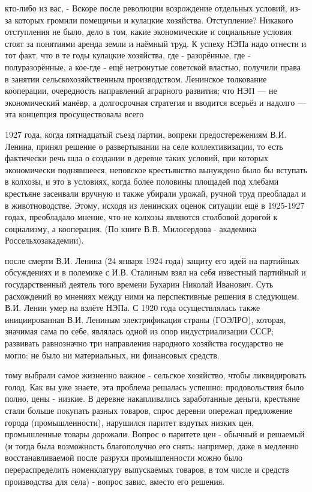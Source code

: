 кто-либо из вас, - Вскоре после революции возрождение отдельных условий, из-за которых громили помещичьи и кулацкие хозяйства. Отступление? Никакого отступления не было, дело в том, какие экономические и социальные условия стоят за понятиями аренда земли и наёмный труд. К успеху НЭПа надо отнести и тот факт, что в те годы кулацкие хозяйства, где - разорённые, где - полуразорённые, а кое-где - ещё нетронутые советской властью, получили права в занятии сельскохозяйственным производством. Ленинское толкование кооперации, очередность направлений аграрного развития; что НЭП — не экономический манёвр, а долгосрочная стратегия и вводится всерьёз и надолго — эта концепция просуществовала всего

1927 года, когда пятнадцатый съезд партии, вопреки предостережениям В.И. Ленина, принял решение о развертывании на селе коллективизации, то есть фактически речь шла о создании в деревне таких условий, при которых экономически поднявшееся, неповское крестьянство вынуждено было бы вступать в колхозы, и это в условиях, когда более половины площадей под хлебами крестьяне засеивали вручную и также убирали урожай, ручной труд преобладал и в животноводстве. Этому, исходя из ленинских оценок ситуации ещё в 1925-1927 годах, преобладало мнение, что не колхозы являются столбовой дорогой к социализму, а кооперация. (По книге В.В. Милосердова - академика Россельхозакадемии).

после смерти
В.И. Ленина (24 января 1924 года) защиту его идей на партийных обсуждениях и в полемике с И.В. Сталиным взял на себя известный партийный и государственный деятель того времени Бухарин Николай Иванович. Суть расхождений во мнениях между ними на перспективные решения в следующем. В.И. Ленин умер на взлёте НЭПа. С 1920 года осуществлялась также инициированная В.И. Лениным электрификация страны (ГОЭЛРО), которая, значимая сама по себе, являлась одной из опор индустриализации СССР; развивать равнозначно три направления народного хозяйства государство не могло: не было ни материальных, ни финансовых средств.

тому выбрали самое жизненно важное - сельское хозяйство, чтобы ликвидировать голод. Как вы уже знаете, эта проблема решалась успешно: продовольствия было полно, цены - низкие. В деревне накапливались заработанные деньги, крестьяне стали больше покупать разных товаров, спрос деревни опережал предложение города (промышленности), нарушился паритет вздутых низких цен, промышленные товары дорожали. Вопрос о паритете цен - обычный и решаемый (и тогда была возможность благополучно его снять: например, даже в медленно восстанавливаемой после разрухи промышленности можно было перераспределить номенклатуру выпускаемых товаров, в том числе и средств производства для села) - вопрос завис, вместо его решения.

